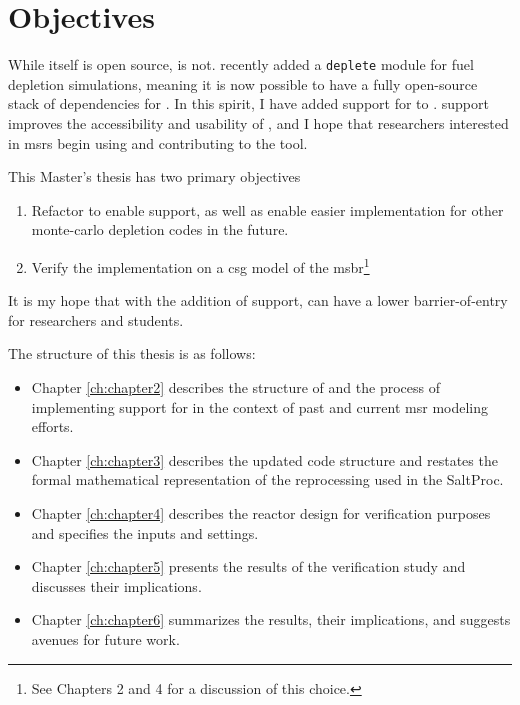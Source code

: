 \section{Objectives}%
\label{sec:objectives}

While \SaltProc itself is open source, \SerpentTWO is not. \OpenMC recently
added a \verb.deplete. module for fuel depletion simulations, meaning it is now
possible to have a fully open-source stack of dependencies for \SaltProc.
In this spirit, I have added support for \OpenMC to \SaltProc. \OpenMC support improves
the accessibility and usability of \SaltProc, and I hope that researchers
interested in \Gls{msr}s begin using and contributing to the tool.

This Master's thesis has two primary objectives
\begin{enumerate}
    \item Refactor \SaltProc to enable \OpenMC support, as well as enable
        easier implementation for other monte-carlo depletion codes in the
        future. 
    \item Verify the implementation on a \Gls{csg} model of the \Gls{msbr}\footnote{See
        Chapters 2 and 4 for a discussion of this choice.}
\end{enumerate}

It is my hope that with the addition of \OpenMC support, \SaltProc can have a
lower barrier-of-entry for researchers and students. 

The structure of this thesis is as follows:
\begin{itemize}
    \item Chapter \ref{ch:chapter2} describes the structure of \SaltProc and the process of
        implementing support for \OpenMC in the context of past and current
        \Gls{msr} modeling efforts.
    \item Chapter \ref{ch:chapter3} describes the updated code structure and restates the
        formal mathematical representation of the reprocessing used in the
        SaltProc.
    \item Chapter \ref{ch:chapter4} describes the reactor design for verification purposes and
        specifies the inputs and settings.
    \item Chapter \ref{ch:chapter5} presents the results of the verification study and
        discusses their implications.
    \item Chapter \ref{ch:chapter6} summarizes the results, their implications, and suggests
        avenues for future work.
\end{itemize}

